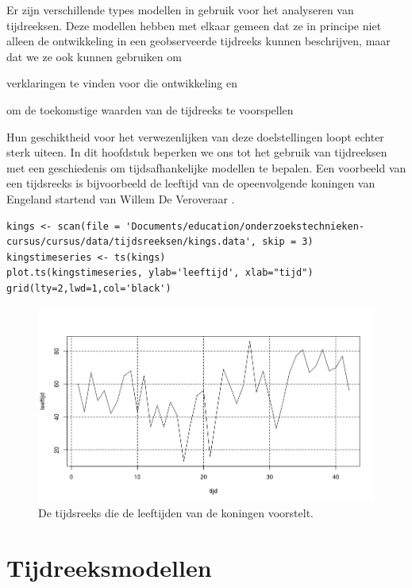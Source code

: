 Er zijn verschillende types modellen in gebruik voor het analyseren van tijdreeksen. Deze modellen hebben met elkaar gemeen dat ze in principe niet alleen de ontwikkeling in een geobserveerde tijdreeks kunnen beschrijven, maar dat we ze ook kunnen gebruiken om
\begin{inparaenum}[(i)]
	\item verklaringen te vinden voor die ontwikkeling en
	\item om de toekomstige waarden van de tijdreeks te voorspellen
\end{inparaenum}
Hun geschiktheid voor het verwezenlijken van deze doelstellingen loopt echter sterk uiteen. In dit hoofdstuk beperken we ons tot het gebruik van tijdreeksen met een geschiedenis om tijdsafhankelijke modellen te bepalen. Een voorbeeld van een tijdsreeks is bijvoorbeeld de leeftijd van de opeenvolgende koningen van Engeland startend van Willem De Veroveraar \autocite{Hipel1994}.
\begin{lstlisting}
kings <- scan(file = 'Documents/education/onderzoekstechnieken-cursus/cursus/data/tijdsreeksen/kings.data', skip = 3)
kingstimeseries <- ts(kings)
plot.ts(kingstimeseries, ylab='leeftijd', xlab="tijd")
grid(lty=2,lwd=1,col='black')
\end{lstlisting}

\begin{figure}
	\centering
	\includegraphics[width=\textwidth]{images/tijdsreeksen/tijdsreekskings.png}
	\caption{De tijdsreeks die de leeftijden van de koningen voorstelt.}
	\label{fig:tijdreeks11}
\end{figure}


\section{Tijdreeksmodellen}

